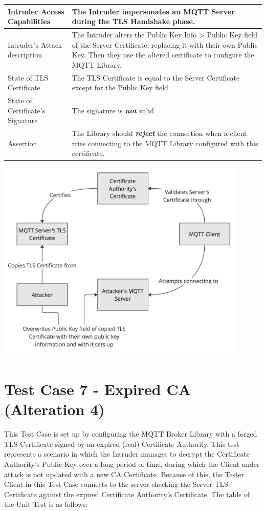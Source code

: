 \documentclass[binding=0.6cm,noexaminfo]{sapthesis}
\begin{document}
\begin{center}
\begin{tabular}{| p{6cm} | p{6cm} |}
\hline
Intruder Access Capabilities & The Intruder impersonates an MQTT Server during the TLS Handshake phase. \\
\hline
Intruder’s Attack description & The Intruder alters the Public Key Info > Public Key field of the Server Certificate, replacing it with their own Public Key. Then they use the altered certificate to configure the MQTT Library. \\
\hline
State of TLS Certificate & The TLS Certificate is equal to the Server Certificate except for the Public Key field. \\
\hline
State of Certificate’s Signature & The signature is \textbf{\textit{not}} valid \\
\hline
Assertion & The Library should \textbf{\textit{reject}} the connection when a client tries connecting to the MQTT Library configured with this certificate. \\
\hline
\end{tabular}
\end{center}

\includegraphics[width=12cm]{TC6}

\newpage
\section{Test Case 7 - Expired CA (Alteration 4)}
This Test Case is set up by configuring the MQTT Broker Library with a forged TLS Certificate signed by an expired (real) Certificate Authority. This test represents a scenario in which the Intruder manages to decrypt the Certificate Authority’s Public Key over a long period of time, during which the Client under attack is not updated with a new CA Certificate. Because of this, the Tester Client in this Test Case connects to the server checking the Server TLS Certificate against the expired Certificate Authority’s Certificate. The table of the Unit Test is as follows:
\end{document}
